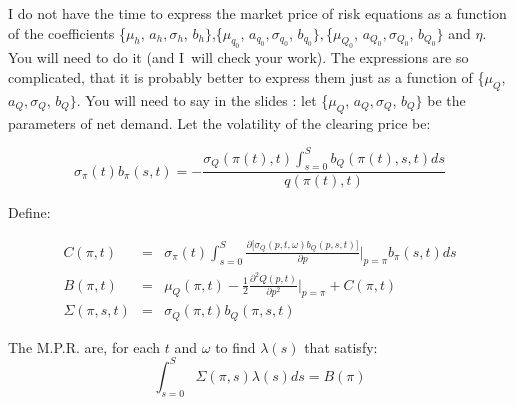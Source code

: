 \documentclass{article}
\begin{document}
I do not have the time to express the market price of risk equations as a
function of the coefficients \{$\mu _{h}$, $a_{h},\sigma _{h}$, $b_{h}\}$,\{$%
\mu _{q_{0}}$, $a_{q_{0}},\sigma _{q_{0}}$, $b_{q_{0}}\},$\{$\mu _{Q_{0}}$, $%
a_{Q_{0}},\sigma _{Q_{0}}$, $b_{Q_{0}}\}$ and $\eta $. You will need to do
it (and I\ will check your work). The expressions are so complicated, that
it is probably better to express them just as a function of \{$\mu _{Q}$, $%
a_{Q},\sigma _{Q}$, $b_{Q}\}$. You will need to say in the slides : let \{$%
\mu _{Q}$, $a_{Q},\sigma _{Q}$, $b_{Q}\}$ be the parameters of net demand.
Let the volatility of the clearing price be:

\begin{equation*}
\sigma _{\pi }(t)b_{\pi }(s,t)=-\frac{\sigma _{Q}(\pi
(t),t)\int_{s=0}^{S}b_{Q}(\pi (t),s,t)ds}{q(\pi (t),t)}
\end{equation*}%
\bigskip 

Define:

\begin{eqnarray*}
C(\pi ,t) &=&\sigma _{\pi }(t)\int_{s=0}^{S}\frac{\partial \lbrack \sigma
_{Q}(p,t,\omega )b_{Q}(p,s,t)]}{\partial p}|_{p=\pi }b_{\pi }(s,t)ds \\
B(\pi ,t) &=&\mu _{Q}(\pi ,t)-\frac{1}{2}\frac{\partial ^{2}Q(p,t)}{\partial
p^{2}}|_{p=\pi }+C(\pi ,t) \\
\Sigma (\pi ,s,t) &=&\sigma _{Q}(\pi ,t)b_{Q}(\pi ,s,t)
\end{eqnarray*}%
\bigskip 

The M.P.R. are, for each $t$ and $\omega $ to find $\lambda (s)$ that
satisfy:%
\begin{equation*}
\int_{s=0}^{S}\Sigma (\pi ,s)\lambda (s)ds=B(\pi )
\end{equation*}
\end{document}

